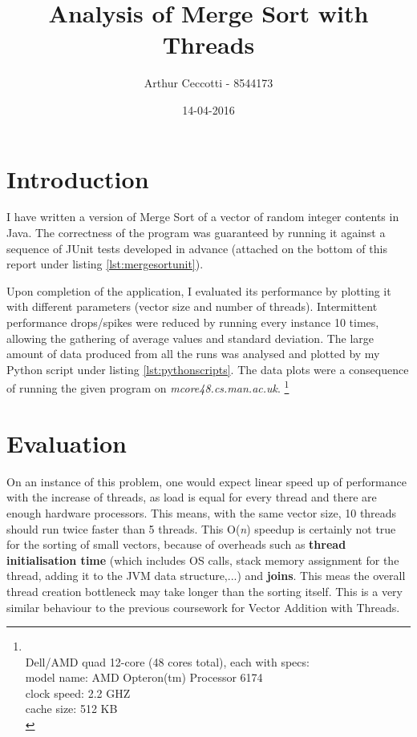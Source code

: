 \documentclass{article}
\title{Analysis of Merge Sort with Threads}
\date{14-04-2016}
\author{Arthur Ceccotti - 8544173}
\begin{document}
  \maketitle

  \section{Introduction}
  I have written a version of Merge Sort of a vector of random integer contents in Java. The correctness of the program was guaranteed by running it against a sequence of JUnit tests developed in advance (attached on the bottom of this report under listing \ref{lst:mergesortunit}).

  Upon completion of the application, I evaluated its performance by plotting it with different parameters (vector size and number of threads). Intermittent performance drops/spikes were reduced by running every instance 10 times, allowing the gathering of average values and standard deviation. The large amount of data produced from all the runs was analysed and plotted by my Python script under listing \ref{lst:pythonscripts}. The data plots were a consequence of running the given program on \textit{mcore48.cs.man.ac.uk}. \footnote{\label{machinespecs} \\
  Dell/AMD quad 12-core (48 cores total), each with specs:\\
  model name: AMD Opteron(tm) Processor 6174 \\
  clock speed: 2.2 GHZ \\
  cache size: 512 KB \\}

  \section{Evaluation}
  On an instance of this problem, one would expect linear speed up of performance with the increase of threads, as load is equal for every thread and there are enough hardware processors. This means, with the same vector size, 10 threads should run twice faster than 5 threads. This O(\textit{n}) speedup is certainly not true for the sorting of small vectors, because of overheads such as \textbf{thread initialisation time} (which includes OS calls, stack memory assignment for the thread, adding it to the JVM data structure,...) and \textbf{joins}. This meas the overall thread creation bottleneck may take longer than the sorting itself. This is a very similar behaviour to the previous coursework for Vector Addition with Threads.
\end{document}
